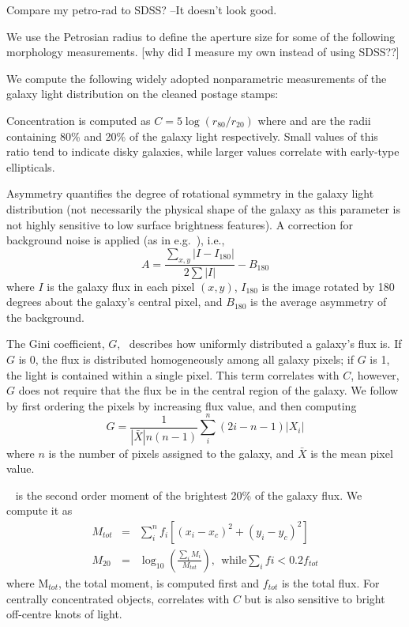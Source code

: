 Compare my petro-rad to SDSS? --It doesn't look good. 

We use the Petrosian radius to define the aperture size for some of the following morphology measurements. [why did I measure my own instead of using SDSS??]

We compute the following widely adopted nonparametric measurements of the galaxy light distribution on the cleaned postage stamps:

Concentration is computed as $C = 5\log(r_{80}/ r_{20})$ where  and  are the
radii containing 80\% and 20\% of the galaxy light respectively.  Small values of this ratio 
tend to indicate disky galaxies, while larger values correlate with early-type ellipticals. 

Asymmetry quantifies the degree of rotational symmetry in the galaxy light distribution
 (not necessarily the physical shape of the galaxy as this parameter is not highly sensitive 
to low surface brightness features). A correction for background noise is applied (as in e.g.~\cite{Conselice2000}), i.e., 
\begin{equation}
A = \frac{\sum_{x,y} |I - I_{180}|}{ 2\sum|I|} - B_{180}
\end{equation}
where $I$ is the galaxy flux in each pixel $(x, y)$, $I_{180}$ is the image rotated by 180 degrees about the galaxy's central pixel, and $B_{180}$ is the average asymmetry of the background. 

The Gini coefficient, $G$,~\citep{Glasser1962, Abraham2003} describes how uniformly distributed a galaxy's flux is.  If $G$ is 0, the flux is distributed homogeneously among all galaxy pixels; if $G$ is 1,  the light is contained within a single pixel. This term correlates with $C$, however, $G$ does not require that the flux be in the central region of the galaxy.  We follow~\cite{Lotz2004} by first ordering the pixels by increasing flux value, and then computing
\begin{equation}
G = \frac{1}{|\bar X|n(n-1)}\sum_i^n(2i-n-1)|X_i|
\end{equation}
where $n$ is the number of pixels assigned to the galaxy, and $\bar X$ is the mean pixel value. 

~\citep{Lotz2004} is the second order moment of the brightest 20\% of the galaxy flux. We compute it as
\begin{eqnarray}
 M_{tot} & = & \sum_i^nf_i[(x_i-x_c)^2 + (y_i-y_c)^2]  \\
 M_{20} & = & \log_{10} (\frac{\sum_iM_i}{M_{tot}}), ~~\textrm{while} \sum_ifi < 0.2f_{tot}
\end{eqnarray}
where M$_{tot}$, the total moment, is computed first and $f_{tot}$ is the total flux. For centrally concentrated objects,  correlates with $C$ but is also sensitive to bright off-centre knots of light. 

